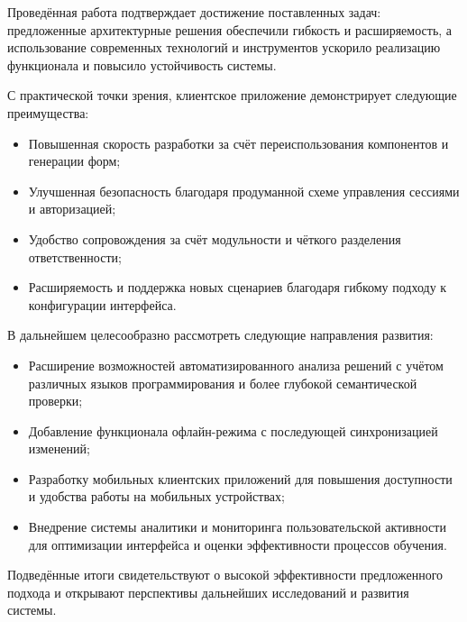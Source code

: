 Проведённая работа подтверждает достижение поставленных задач: предложенные архитектурные решения обеспечили гибкость и расширяемость, а использование современных технологий и инструментов ускорило реализацию функционала и повысило устойчивость системы. 

С практической точки зрения, клиентское приложение демонстрирует следующие преимущества:
\begin{itemize}
  \item Повышенная скорость разработки за счёт переиспользования компонентов и генерации форм;
  \item Улучшенная безопасность благодаря продуманной схеме управления сессиями и авторизацией;
  \item Удобство сопровождения за счёт модульности и чёткого разделения ответственности;
  \item Расширяемость и поддержка новых сценариев благодаря гибкому подходу к конфигурации интерфейса.
\end{itemize}

В дальнейшем целесообразно рассмотреть следующие направления развития:
\begin{itemize}
  \item Расширение возможностей автоматизированного анализа решений с учётом различных языков программирования и более глубокой семантической проверки;
  \item Добавление функционала офлайн-режима с последующей синхронизацией изменений;
  \item Разработку мобильных клиентских приложений для повышения доступности и удобства работы на мобильных устройствах;
  \item Внедрение системы аналитики и мониторинга пользовательской активности для оптимизации интерфейса и оценки эффективности процессов обучения.
\end{itemize}

Подведённые итоги свидетельствуют о высокой эффективности предложенного подхода и открывают перспективы дальнейших исследований и развития системы.
